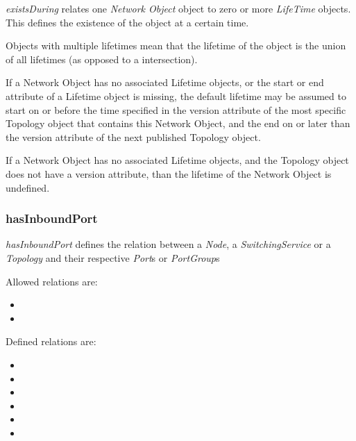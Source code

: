 \emph{existsDuring} relates one \emph{Network Object} object to zero or more \emph{LifeTime} objects. This defines the existence of the object at a certain time.


Objects with multiple lifetimes mean that the lifetime of the object is the union of all lifetimes (as opposed to a intersection).

If a Network Object has no associated Lifetime objects, or the start or end attribute of a Lifetime object is missing, the default lifetime may be assumed to start on or before the time specified in the version attribute of the most specific Topology object that contains this Network Object, and the end on or later than the version attribute of the next published Topology object.

If a Network Object has no associated Lifetime objects, and the Topology object does not have a version attribute, than the lifetime of the Network Object is undefined.

\subsubsection{hasInboundPort}%
\label{rel:hasInboundPort}

\emph{hasInboundPort} defines the relation between a \emph{Node}, a \emph{SwitchingService} or a \emph{Topology} and their respective \emph{Port}s or \emph{PortGroup}s

Allowed relations are:
\begin{itemize}
    \item {}
    \item {}
\end{itemize}

Defined relations are:
\begin{itemize}
    \item {}
    \item {}
    \item {}
    \item {}
    \item {}
    \item {}
\end{itemize}


